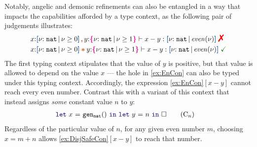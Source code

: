 Notably, angelic and demonic refinements can also be entangled in a
way that impacts the capabilities afforded by a type context, as the
following pair of judgements illustrates:
\vspace{-0.2em}
\begin{align*}
  &x{:}\urt{\Nat}{\vnu \geq 0} \ctcomma y{:}\ort{\Nat}{\vnu \geq 1} \vdash x - y : \urt{\Nat}{\I{even}(\vnu)} \;\judgfail
  \\&x{:}\urt{\Nat}{\vnu \geq 0} \ctstar y{:}\ort{\Nat}{\vnu \geq 1} \vdash x - y : \urt{\Nat}{\I{even}(\vnu)} \;\judgok
\end{align*}\noindent
The first typing context stipulates that the value of $y$ is positive,
but that value is allowed to depend on the value $x$ --- the hole in
\ref{ex:EnCon} can also be typed under this typing
context. Accordingly, the expression \ref{ex:EnCon}$[x - y]$ cannot
reach every even number. Contrast this with a variant of this context
that instead assigns \emph{some} constant value $n$ to $y$:
\begin{align}
  &\zlet{x}{\Code{gen_{nat} () }}{\zlet{y}{n}{\square}}
    \tag{C$_{n}$}\label{ex:DisjSafeCon}
\end{align}
Regardless of the particular value of $n$, for any given even number
$m$, choosing $x = m + n$ allows \ref{ex:DisjSafeCon}$[x - y]$ to
reach that number.



